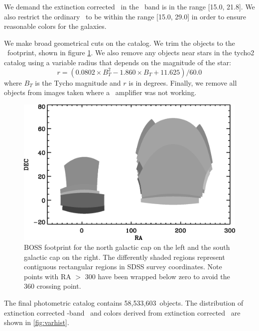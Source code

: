 \documentclass[preprint]{aastex}
\newcommand{\modelrmin}{15.0}
\newcommand{\modelrmax}{29.0}
\newcommand{\rmin}{15.0}
\newcommand{\rmax}{21.8}
\newcommand{\nphoto}{58,533,603}
\begin{document}
We demand the extinction corrected \citep{Schlegel98} \cmodelmag\ in the \rmag\
band is in the range [\rmin, \rmax].  We also restrict the ordinary \modelmag\
to be within the range [\modelrmin, \modelrmax] in order to ensure reasonable
colors for the galaxies.

We make broad geometrical cuts on the catalog.  We trim the objects to the
\boss\ footprint, shown in figure \ref{fig:footprint}. We also remove any
objects near stars in the tycho2 catalog \citep{tycho2} using a variable radius
that depends on the magnitude of the star:
\begin{equation}
r = (0.0802\times B_T^2 - 1.860\times B_T + 11.625)/60.0
\end{equation}
where $B_T$ is the Tycho magnitude and $r$ is in degrees.  Finally, we remove
all objects from images taken where a \umag\ amplifier was not working.

\begin{figure}[t] \centering
 \centering 
 \includegraphics[scale=0.75]{figures/boss-poly-coverage.eps}
 \caption{BOSS footprint for the north galactic cap on the left
 and the south galactic cap on the right.  The differently shaded
 regions represent contiguous rectangular regions in SDSS survey coordinates.
 Note points with RA $>$ 300 have been wrapped below zero 
 to avoid the 360 crossing point.}
 \label{fig:footprint}
\end{figure}

The final photometric catalog contains \nphoto\ objects.  The distribution of
extinction corrected \rmag-band \cmodelmag\ and colors derived from extinction
corrected \modelmag\ are shown in \ref{fig:varhist}.
\end{document}

